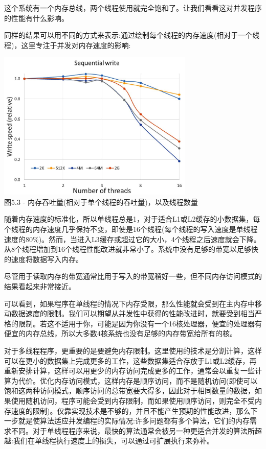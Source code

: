 这个系统有一个内存总线，两个线程使用就完全饱和了。让我们看看这对并发程序的性能有什么影响。


同样的结果可以用不同的方式来表示:通过绘制每个线程的内存速度(相对于一个线程)，这里专注于并发对内存速度的影响:

\begin{center}
\includegraphics[width=0.7\textwidth]{content/1/chapter5/images/3.jpg}\\
图5.3 - 内存吞吐量(相对于单个线程的吞吐量)，以及线程数量
\end{center}

随着内存速度的标准化，所以单线程总是1，对于适合L1或L2缓存的小数据集，每个线程的内存速度几乎保持不变，即使是16个线程(每个线程的写入速度是单线程速度的80\%)。然而，当进入L3缓存或超过它的大小，4个线程之后速度就会下降。从8个线程增加到16个线程性能改进就非常小了。系统中没有足够的带宽以足够快的速度将数据写入内存。

尽管用于读取内存的带宽通常比用于写入的带宽稍好一些，但不同内存访问模式的结果看起来非常接近。

可以看到，如果程序在单线程的情况下内存受限，那么性能就会受到在主内存中移动数据速度的限制。我们可以期望从并发性中获得的性能改进时，就要受到相当严格的限制。若这不适用于你，可能是因为你没有一个16核处理器，便宜的处理器有便宜的内存总线，所以大多数4核系统也没有足够的内存带宽给所有的核。

对于多线程程序，更重要的是要避免内存限制。这里使用的技术是分割计算，这样可以在更小的数据集上完成更多的工作，这些数据集适合存放于L1或L2缓存，再重新安排计算，这样可以用更少的内存访问完成更多的工作，通常会以重复一些计算为代价。优化内存访问模式，这样内存是顺序访问，而不是随机访问(即使可以饱和这两种访问模式，顺序访问的总带宽要大得多，因此对于相同数量的数据，如果使用随机访问，程序可能会受到内存限制，而如果使用顺序访问，则完全不受内存速度的限制)。仅靠实现技术是不够的，并且不能产生预期的性能改进，那么下一步就是使算法适应并发编程的实际情况:许多问题都有多个算法，它们的内存需求不同。对于单线程程序来说，最快的算法通常会被另一种更适合并发的算法所超越:我们在单线程执行速度上的损失，可以通过可扩展执行来弥补。

